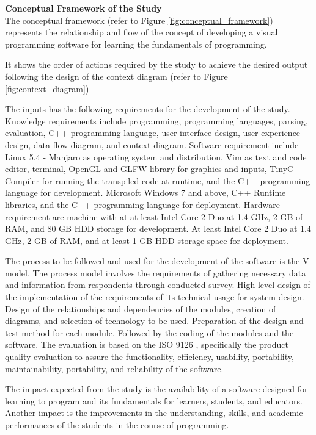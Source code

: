 \flushleft
\textbf{Conceptual Framework of the Study}\\

\justifying
\parx
The conceptual framework (refer to Figure \ref{fig:conceptual_framework}) represents the relationship
and flow of the concept of developing a visual programming software for learning the
fundamentals of programming.

\parx
It shows the order of actions required by the study to achieve the desired
output following the design of the context diagram (refer to Figure \ref{fig:context_diagram})

\parx
The inputs has the following requirements for the development of the study.
Knowledge requirements include programming, programming languages, parsing,
evaluation, C++ programming language, user-interface design, user-experience
design, data flow diagram, and context diagram.  Software requirement include
Linux 5.4 - Manjaro as operating system and distribution, Vim as text and code
editor, terminal, OpenGL and GLFW library for graphics and inputs, TinyC
Compiler for running the transpiled code at runtime, and the C++ programming
language for development. Microsoft Windows 7 and above, C++ Runtime libraries,
and the C++ programming language for deployment.  Hardware requirement are
machine with at at least Intel Core 2 Duo at 1.4 GHz, 2 GB of RAM, and 80 GB
HDD storage for development. At least Intel Core 2 Duo at 1.4 GHz, 2 GB of RAM,
and at least 1 GB HDD storage space for deployment.

\parx
The process to be followed and used for the development of the software is the V model.
The process model involves the requirements of gathering necessary data and information
from respondents through conducted survey. High-level design of the implementation of
the requirements of its technical usage for system design. Design of the relationships
and dependencies of the modules, creation of diagrams, and selection of technology to
be used. Preparation of the design and test method for each module. Followed by the
coding of the modules and the software. The evaluation is based on the ISO 9126
, specifically the product quality evaluation to assure the functionality,
efficiency, usability, portability, maintainability, portability, and
reliability of the software.

\parx
The impact expected from the study is the availability of a software designed for
learning to program and its fundamentals for learners, students, and educators.
Another impact is the improvements in the understanding, skills, and academic
performances of the students in the course of programming.

